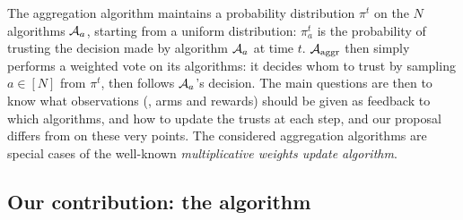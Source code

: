 The aggregation algorithm maintains a probability distribution $\pi^{t}$ on the $N$ algorithms $\mathcal{A}_a$, starting from a uniform distribution:
$\pi^t_a$ is the probability of trusting the decision made by algorithm $\mathcal{A}_a$ at time $t$.
$\mathcal{A}_{\mathrm{aggr}}$ then simply performs a weighted vote on its algorithms: it decides whom to trust by sampling $a \in [N]$ from $\pi^t$, then follows $\mathcal{A}_a$'s decision.
The main questions are then to know what observations (\ie, arms and rewards) should be given as feedback to which algorithms,
and how to update the trusts at each step, and our proposal \Aggr{} differs from \ExpQ{} on these very points.
%
The considered aggregation algorithms are special cases of the well-known \emph{multiplicative weights update algorithm}.



\subsection{Our contribution: the \Aggr{} algorithm}\label{sub:25:Aggr}

